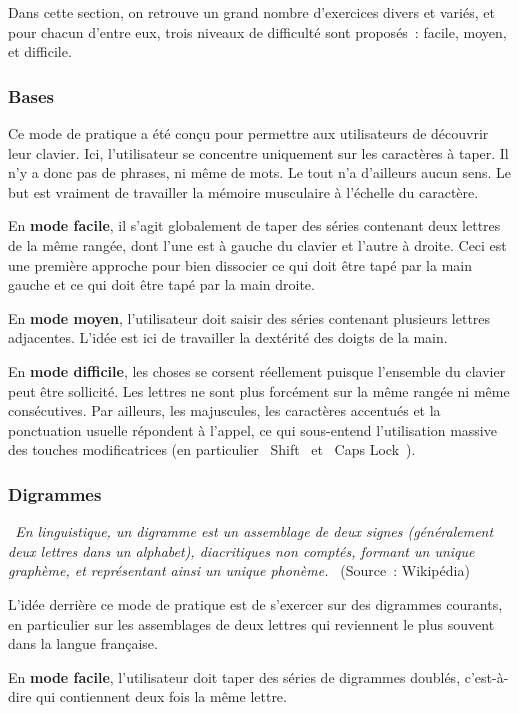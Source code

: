 \documentclass[a4paper,12pt]{article}
\begin{document}
Dans cette section, on retrouve un grand nombre d'exercices divers et variés, et pour chacun d'entre eux, trois niveaux de difficulté sont proposés~: facile, moyen, et difficile.

\subsubsection{Bases}

Ce mode de pratique a été conçu pour permettre aux utilisateurs de découvrir leur clavier. Ici, l'utilisateur se concentre uniquement sur les caractères à taper. Il n'y a donc pas de phrases, ni même de mots. Le tout n'a d'ailleurs aucun sens. Le but est vraiment de travailler la mémoire musculaire à l'échelle du caractère.

En \textbf{mode facile}, il s'agit globalement de taper des séries contenant deux lettres de la même rangée, dont l'une est à gauche du clavier et l'autre à droite. Ceci est une première approche pour bien dissocier ce qui doit être tapé par la main gauche et ce qui doit être tapé par la main droite.

En \textbf{mode moyen}, l'utilisateur doit saisir des séries contenant plusieurs lettres adjacentes. L'idée est ici de travailler la dextérité des doigts de la main.

En \textbf{mode difficile}, les choses se corsent réellement puisque l'ensemble du clavier peut être sollicité. Les lettres ne sont plus forcément sur la même rangée ni même consécutives. Par ailleurs, les majuscules, les caractères accentués et la ponctuation usuelle répondent à l'appel, ce qui sous-entend l'utilisation massive des touches modificatrices (en particulier \og~Shift~\fg{} et \og~Caps Lock~\fg).

\subsubsection{Digrammes}

\textit{\og~En linguistique, un digramme est un assemblage de deux signes (généralement deux lettres dans un alphabet), diacritiques non comptés, formant un unique graphème, et représentant ainsi un unique phonème.~\fg} (Source~: Wikipédia)

L'idée derrière ce mode de pratique est de s'exercer sur des digrammes courants, en particulier sur les assemblages de deux lettres qui reviennent le plus souvent dans la langue française.

En \textbf{mode facile}, l'utilisateur doit taper des séries de digrammes doublés, c'est-à-dire qui contiennent deux fois la même lettre.
\end{document}
